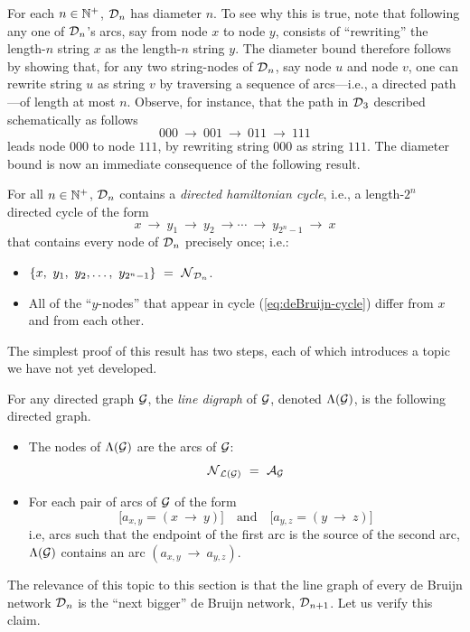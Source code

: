 For each $n \in \mathbb{N}^+$, $\mbox{$\cal D$}_n$ has diameter $n$.  To see why this is
true, note that following any one of $\mbox{$\cal D$}_n$'s arcs, say from node $x$
to node $y$, consists of ``rewriting'' the length-$n$ string $x$ as
the length-$n$ string $y$.  The diameter bound therefore follows by
showing that, for any two string-nodes of $\mbox{$\cal D$}_n$, say node $u$ and
node $v$, one can rewrite string $u$ as string $v$ by traversing a
sequence of arcs---i.e., a directed path---of length at most $n$.
Observe, for instance, that the path in $\mbox{$\cal D$}_3$ described schematically
as follows
\[ 000 \ \rightarrow \ 001 \ \rightarrow \ 011 \ \rightarrow \ 111 \]
leads node $000$ to node $111$, by rewriting string $000$ as string
$111$.  The diameter bound is now an immediate consequence of the
following result.

\begin{prop}
\label{thm:deBruijn-hamiltonian}
For all $n \in \mathbb{N}^+$, $\mbox{$\cal D$}_n$ contains a {\em directed hamiltonian
  cycle}, 
i.e., a length-$2^n$ directed cycle of the form
\begin{equation}
\label{eq:deBruijn-cycle}
 x \ \rightarrow \ y_1 \ \rightarrow \ y_2 \ \rightarrow \cdots
\ \rightarrow \ y_{2^n-1} \ \rightarrow \ x
\end{equation}
that contains every node of $\mbox{$\cal D$}_n$ precisely once; i.e.:
\begin{itemize}
\item
$\{x, \ y_1, \ y_2, \ldots, \ y_{2^n-1}\} \ = \ \n_{\fd_n}$.
\item
All of the ``$y$-nodes'' that appear in cycle
(\ref{eq:deBruijn-cycle}) differ from $x$ and from each other.
\end{itemize}
\end{prop}

The simplest proof of this result has two steps, each of which
introduces a topic we have not yet developed.

\medskip

%
For any directed graph $\mbox{$\cal G$}$, the {\it line digraph} 
 of $\mbox{$\cal G$}$, denoted $\Lambda(\mbox{$\cal G$})$, is the following
directed graph.
\begin{itemize}
\item
The nodes of $\Lambda(\mbox{$\cal G$})$ are the arcs of $\mbox{$\cal G$}$:
\[ \n_{{\cal L}({\cal G})} \ = \ \a_{\fg} \]
\item
For each pair of arcs of $\mbox{$\cal G$}$ of the form
\[ \big[a_{x,y} = (x \ \rightarrow \ y) \big] \ \ \ \mbox{ and } \ \ \ 
\big[a_{y,z} = (y \ \rightarrow \ z) \big]
\]
i.e, arcs such that the endpoint of the first arc is the source of the
second arc, $\Lambda(\mbox{$\cal G$})$ contains an arc $(a_{x,y} \ \rightarrow
\ a_{y,z})$.
\end{itemize}
The relevance of this topic to this section is that the line graph of
every de Bruijn network $\mbox{$\cal D$}_n$ is the ``next bigger'' de Bruijn
network, $\mbox{$\cal D$}_{n+1}$.  Let us verify this claim.

